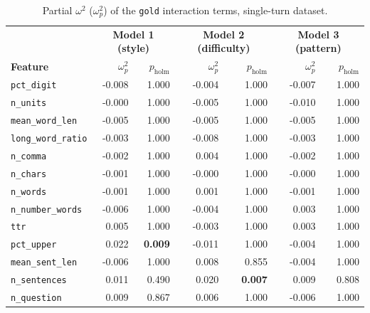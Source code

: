 \begin{table}[H]
    \centering
    \small
    \begin{tabular}{@{}lrrrrrr@{}}
        \toprule
        & \multicolumn{2}{c}{\textbf{Model 1 (style)}} & \multicolumn{2}{c}{\textbf{Model 2 (difficulty)}} & \multicolumn{2}{c}{\textbf{Model 3 (pattern)}} \\
        \textbf{Feature} & $\omega_p^2$ & $p_{\text{holm}}$ & $\omega_p^2$ & $p_{\text{holm}}$ & $\omega_p^2$ & $p_{\text{holm}}$ \\
        \midrule
        \texttt{pct\_digit}        & -0.008 & 1.000 & -0.004 & 1.000 & -0.007 & 1.000 \\
        \texttt{n\_units}          & -0.000 & 1.000 & -0.005 & 1.000 & -0.010 & 1.000 \\
        \texttt{mean\_word\_len}   & -0.005 & 1.000 & -0.005 & 1.000 & -0.005 & 1.000 \\
        \texttt{long\_word\_ratio} & -0.003 & 1.000 & -0.008 & 1.000 & -0.003 & 1.000 \\
        \texttt{n\_comma}          & -0.002 & 1.000 & 0.004  & 1.000 & -0.002 & 1.000 \\
        \texttt{n\_chars}          & -0.001 & 1.000 & -0.000 & 1.000 & -0.000 & 1.000 \\
        \texttt{n\_words}          & -0.001 & 1.000 & 0.001  & 1.000 & -0.001 & 1.000 \\
        \texttt{n\_number\_words}  & -0.006 & 1.000 & -0.004 & 1.000 & 0.003  & 1.000 \\
        \texttt{ttr}               & 0.005  & 1.000 & -0.003 & 1.000 & 0.003  & 1.000 \\
        \texttt{pct\_upper}        & \cellcolor{omegaSmall}0.022  & \textbf{0.009} & -0.011 & 1.000 & -0.004 & 1.000 \\
        \texttt{mean\_sent\_len}   & -0.006 & 1.000 & 0.008  & 0.855 & -0.004 & 1.000 \\
        \texttt{n\_sentences}      & 0.011  & 0.490 & \cellcolor{omegaSmall}0.020  & \textbf{0.007} & 0.009  & 0.808 \\
        \texttt{n\_question}       & 0.009  & 0.867 & 0.006  & 1.000 & -0.006 & 1.000 \\
        \bottomrule
    \end{tabular}
    \caption[Partial $\omega^2$ of \texttt{gold} interaction terms, single-turn dataset]{Partial $\omega^2$ ($\omega_p^2$) of the \texttt{gold} interaction terms, single-turn dataset.}
    \label{tab:interactions-single}


\end{table}
